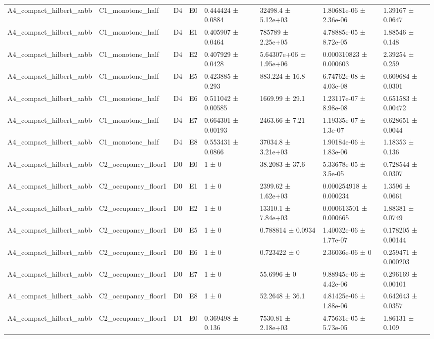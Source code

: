 \begin{table}
\begin{tabular}{lllllllll}
A4\_compact\_hilbert\_aabb & C1\_monotone\_half & D4 & E0 & 0.444424 ± 0.0884 &  & 32498.4 ± 5.12e+03 & 1.80681e-06 ± 2.36e-06 & 1.39167 ± 0.0647 \\
A4\_compact\_hilbert\_aabb & C1\_monotone\_half & D4 & E1 & 0.405907 ± 0.0464 &  & 785789 ± 2.25e+05 & 4.78885e-05 ± 8.72e-05 & 1.88546 ± 0.148 \\
A4\_compact\_hilbert\_aabb & C1\_monotone\_half & D4 & E2 & 0.407929 ± 0.0428 &  & 5.64307e+06 ± 1.95e+06 & 0.000310823 ± 0.000603 & 2.39254 ± 0.259 \\
A4\_compact\_hilbert\_aabb & C1\_monotone\_half & D4 & E5 & 0.423885 ± 0.293 &  & 883.224 ± 16.8 & 6.74762e-08 ± 4.03e-08 & 0.609684 ± 0.0301 \\
A4\_compact\_hilbert\_aabb & C1\_monotone\_half & D4 & E6 & 0.511042 ± 0.00585 &  & 1669.99 ± 29.1 & 1.23117e-07 ± 8.98e-08 & 0.651583 ± 0.00472 \\
A4\_compact\_hilbert\_aabb & C1\_monotone\_half & D4 & E7 & 0.664301 ± 0.00193 &  & 2463.66 ± 7.21 & 1.19335e-07 ± 1.3e-07 & 0.628651 ± 0.0044 \\
A4\_compact\_hilbert\_aabb & C1\_monotone\_half & D4 & E8 & 0.553431 ± 0.0866 &  & 37034.8 ± 3.21e+03 & 1.90184e-06 ± 1.83e-06 & 1.18353 ± 0.136 \\
A4\_compact\_hilbert\_aabb & C2\_occupancy\_floor1 & D0 & E0 & 1 ± 0 &  & 38.2083 ± 37.6 & 5.33678e-05 ± 3.5e-05 & 0.728544 ± 0.0307 \\
A4\_compact\_hilbert\_aabb & C2\_occupancy\_floor1 & D0 & E1 & 1 ± 0 &  & 2399.62 ± 1.62e+03 & 0.000254918 ± 0.000234 & 1.3596 ± 0.0661 \\
A4\_compact\_hilbert\_aabb & C2\_occupancy\_floor1 & D0 & E2 & 1 ± 0 &  & 13310.1 ± 7.84e+03 & 0.000613501 ± 0.000665 & 1.88381 ± 0.0749 \\
A4\_compact\_hilbert\_aabb & C2\_occupancy\_floor1 & D0 & E5 & 1 ± 0 &  & 0.788814 ± 0.0934 & 1.40032e-06 ± 1.77e-07 & 0.178205 ± 0.00144 \\
A4\_compact\_hilbert\_aabb & C2\_occupancy\_floor1 & D0 & E6 & 1 ± 0 &  & 0.723422 ± 0 & 2.36036e-06 ± 0 & 0.259471 ± 0.000203 \\
A4\_compact\_hilbert\_aabb & C2\_occupancy\_floor1 & D0 & E7 & 1 ± 0 &  & 55.6996 ± 0 & 9.88945e-06 ± 4.42e-06 & 0.296169 ± 0.00101 \\
A4\_compact\_hilbert\_aabb & C2\_occupancy\_floor1 & D0 & E8 & 1 ± 0 &  & 52.2648 ± 36.1 & 4.81425e-06 ± 1.88e-06 & 0.642643 ± 0.0357 \\
A4\_compact\_hilbert\_aabb & C2\_occupancy\_floor1 & D1 & E0 & 0.369498 ± 0.136 &  & 7530.81 ± 2.18e+03 & 4.75631e-05 ± 5.73e-05 & 1.86131 ± 0.109 \\

\end{tabular}
\end{table}
